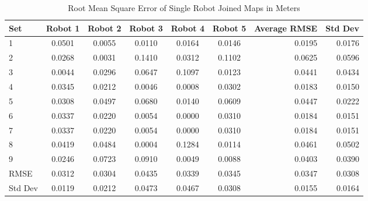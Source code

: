 \documentclass[12pt]{report}
\begin{document}
\begin{center}
\begin{table}[h]
  \caption{Root Mean Square Error of Single Robot Joined Maps in Meters}
  \begin{tabular}{| l | c | c | c | c | c || r ||r |}
    \hline
     Set & Robot 1 & Robot 2 & Robot 3 & Robot 4 & Robot 5 & Average RMSE & Std Dev \\ \hline \hline
	 1 & 0.0501 & 0.0055 & 0.0110 & 0.0164 & 0.0146 & 0.0195 & 0.0176\\ \hline
     2 & 0.0268 & 0.0031 & 0.1410 & 0.0312 & 0.1102 & 0.0625 & 0.0596\\ \hline
     3 & 0.0044 & 0.0296 & 0.0647 & 0.1097 & 0.0123 & 0.0441 & 0.0434\\ \hline
     4 & 0.0345 & 0.0212 & 0.0046 & 0.0008 & 0.0302 & 0.0183 & 0.0150\\ \hline
     5 & 0.0308 & 0.0497 & 0.0680 & 0.0140 & 0.0609 & 0.0447 & 0.0222\\ \hline
     6 & 0.0337 & 0.0220 & 0.0054 & 0.0000 & 0.0310 & 0.0184 & 0.0151\\ \hline
     7 & 0.0337 & 0.0220 & 0.0054 & 0.0000 & 0.0310 & 0.0184 & 0.0151\\ \hline
     8 & 0.0419 & 0.0484 & 0.0004 & 0.1284 & 0.0114 & 0.0461 & 0.0502\\ \hline
     9 & 0.0246 & 0.0723 & 0.0910 & 0.0049 & 0.0088 & 0.0403 & 0.0390\\ \hline
    \hline
    RMSE & 0.0312 & 0.0304 & 0.0435 & 0.0339 & 0.0345 & 0.0347 & 0.0308\\ \hline
    Std Dev & 0.0119 & 0.0212 & 0.0473 & 0.0467 & 0.0308 & 0.0155 & 0.0164\\ \hline
    \hline
  \end{tabular}
  \end{table}
\end{center}
\end{document}
